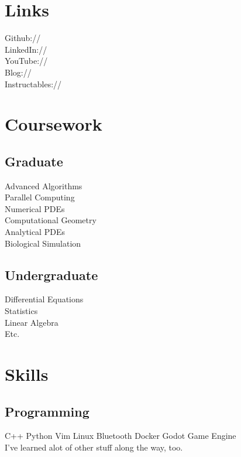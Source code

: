 \documentclass[]{deedy-resume-openfont}
\begin{document}
\begin{minipage}[t]{0.33\textwidth}
    \section{Links} 
    Github:// \href{https://github.com/melvyniandrag}{} \\
    LinkedIn://  \href{https://www.linkedin.com/in/melvyn-ian-drag-374613107/}{} \\
    YouTube://  \href{https://www.youtube.com/results?search_query=Melvyn+Drag}{} \\
    Blog://  \href{https://www.melvyniandrag.github.io}{} \\
    Instructables:// \href{https://www.instructables.com/member/MelvynD/}{}
    \sectionsep


    \section{Coursework}
    \subsection{Graduate}
    Advanced Algorithms \\
    Parallel Computing \\
    Numerical PDEs \\
    Computational Geometry \\
    Analytical PDEs \\ 
    Biological Simulation
    \sectionsep

    \subsection{Undergraduate}
    Differential Equations \\
    Statistics \\
    Linear Algebra \\
    Etc.
    \sectionsep


    \section{Skills}
    \subsection{Programming}
    C++ \textbullet{}   Python \textbullet{} Vim \textbullet{} Linux \textbullet{} Bluetooth \textbullet{} Docker \textbullet{} Godot Game Engine \\
    I've learned alot of other stuff along the way, too.
    \sectionsep


\end{minipage}
\end{document}
